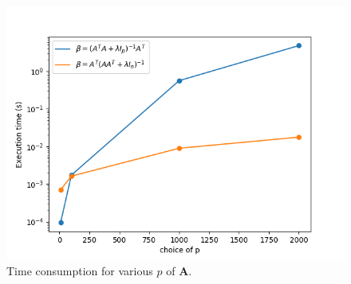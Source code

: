 \documentclass[11pt]{article}
\newcommand{\mtx}[1]{\mathbf{#1}}
\def \mA {\mtx{A}}
\begin{document}
\begin{enumerate}
\begin{figure}
		\centering\includegraphics[width=.75\linewidth]{p1.png}
	 	\caption{Time consumption for various $p$ of $\mA$.} %
	 	\label{fig:p1}  %
	\end{figure}
\end{enumerate}
\end{document}
